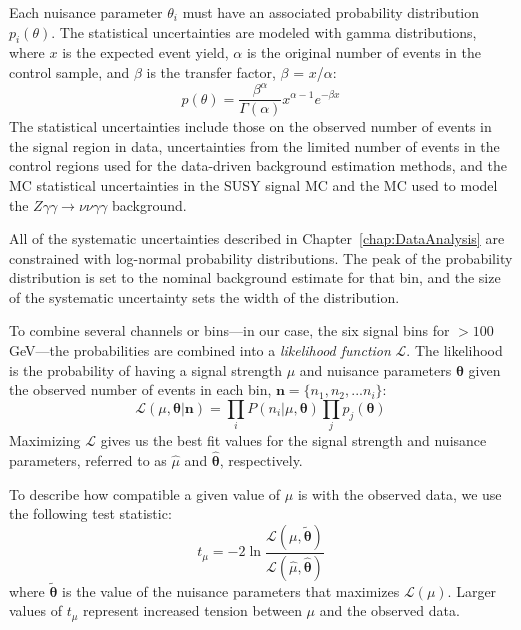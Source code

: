 Each nuisance parameter $\theta_i$ must have an associated probability distribution $p_i(\theta)$.
The statistical uncertainties are modeled with gamma distributions, where $x$ is the expected event yield, 
$\alpha$ is the original number of events in the control sample, 
and $\beta$ is the transfer factor, $\beta$ = $x$/$\alpha$: 
\begin{equation}
p(\theta) =	\dfrac{\beta^\alpha}{\Gamma(\alpha)} x^{\alpha-1}e^{-\beta x}
\end{equation}
The statistical uncertainties include those on the 
observed number of events in the signal region in data, uncertainties from the limited number of events
in the control regions used for the data-driven background estimation methods, and the MC statistical uncertainties 
in the SUSY signal MC and the MC used to model the $Z\gamma\gamma\rightarrow\nu\nu\gamma\gamma$ 
background.

All of the systematic uncertainties described in Chapter~\ref{chap:DataAnalysis} are constrained
with log-normal probability distributions. The peak of the probability distribution 
is set to the nominal background estimate for that bin, and the size of the systematic uncertainty 
sets the width of the distribution. 

To combine several channels or bins---in our case, the six signal bins for \ETmiss $> 100$ GeV---the 
probabilities are combined into a \textit{likelihood function} $\mathcal{L}$. The likelihood is
the probability of having a signal strength $\mu$ and nuisance parameters $\bm{\theta}$ given the observed
number of events in each bin, $\bm{n} = \{n_1,n_2,...n_i\}$:
 \begin{equation}
 \mathcal{L}(\mu, \bm{\theta}|\bm{n}) = \prod_i P(n_i|\mu,\bm{\theta})  \prod_jp_j(\bm{\theta})
 \label{equ:likelihood}
 \end{equation}
Maximizing $\mathcal{L}$ gives us the best fit values for the signal strength and nuisance parameters, referred to
as $\hat{\mu}$ and $\bm{\hat{\theta}}$, respectively.

To describe how compatible a given value of $\mu$ is with the observed data, we use the following test statistic:
\begin{equation}
t_\mu = -2 \ln{ \frac{\mathcal{L}(\mu,\bm{\tilde{\theta}})}{\mathcal{L}(\hat{\mu},\bm{\hat{\theta}})} }
\end{equation}
where $\bm{\tilde{\theta}}$ is the value of the nuisance parameters that maximizes $\mathcal{L}(\mu)$. Larger 
values of $t_\mu$ represent increased tension between $\mu$ and the observed data. 

